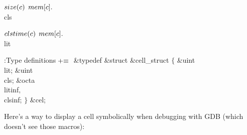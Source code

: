 \B\4\D$\\{size}(\|c)$ \5
$\\{mem}[\|c].{}$\\{cls}\par
\B\4\D$\\{clstime}(\|c)$ \5
$\\{mem}[\|c].{}$\\{lit}\par
\Y\B\4:Type definitions\X${}\mathrel+\equiv{}$\6
\&{typedef} \&{struct} \&{cell\_struct} ${}\{{}$\1\6
\&{uint} \\{lit};\6
\&{uint} \\{cls};\6
\&{octa} \\{litinf}${},{}$ \\{clsinf};\2\6
${}\}{}$ \&{cel};\par
\fi

Here's a way to display a cell symbolically when debugging with
{\mc GDB} (which doesn't see those macros):

